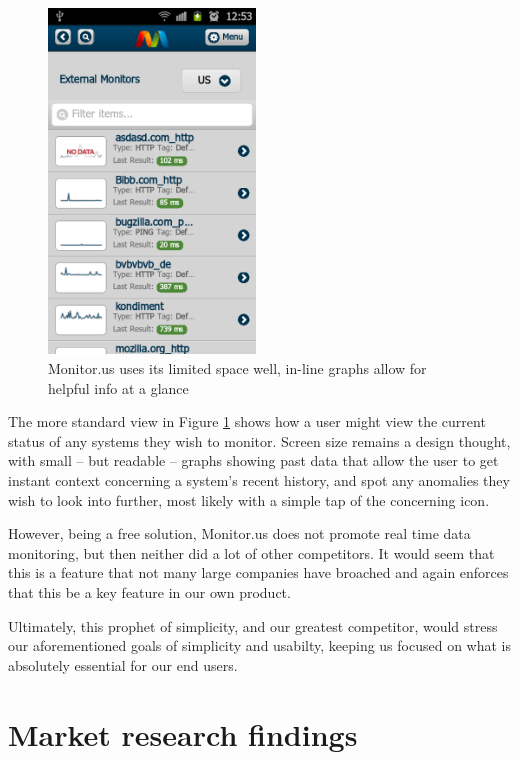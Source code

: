 \documentclass{l3proj}
\begin{document}
\begin{figure}[H]
\centering
\includegraphics[width=55mm]{Competitors/MonitorUS_iPhone2.png}
\caption{Monitor.us uses its limited space well, in-line graphs allow for helpful info at a glance}
\label{fig:MUSiPhone2}
\end{figure}

The more standard view in Figure \ref{fig:MUSiPhone2} shows how a user might view the current status of any systems they wish to monitor. Screen size remains a design thought, with small -- but readable -- graphs showing past data that allow the user to get instant context concerning a system's recent history, and spot any anomalies they wish to look into further, most likely with a simple tap of the concerning icon.

However, being a free solution, Monitor.us does not promote real time data monitoring, but then neither did a lot of other competitors. It would seem that this is a feature that not many large companies have broached and again enforces that this be a key feature in our own product.

Ultimately, this prophet of simplicity, and our greatest competitor, would stress our aforementioned goals of simplicity and usabilty, keeping us focused on what is absolutely essential for our end users.


\section{Market research findings}
\end{document}
